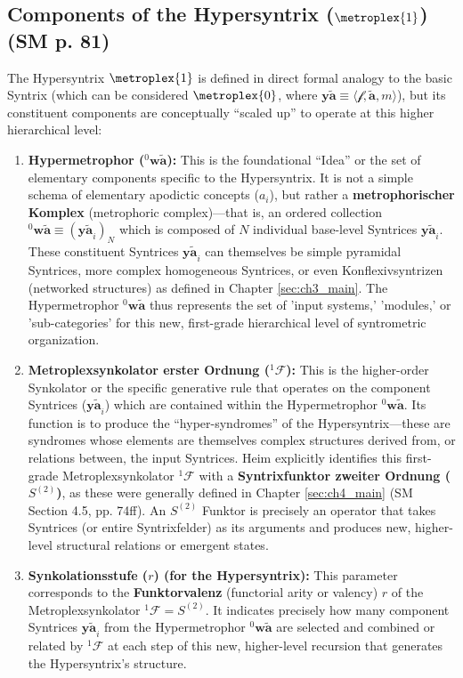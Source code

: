 \documentclass[
    12pt,              %
    a4paper,           %
    headings=normal,   %
    twoside=true,      %
    BCOR=8mm,          %
]{scrbook}
\newcommand{\q}[1]{\enquote{#1}}
\newcommand{\syntrix}{\bm{y\widetilde{a}}}
\newcommand{\metrophor}{\bm{\widetilde{a}}}
\newcommand{\synkolator}{\mathcal{f}}
\newcommand{\synkolationsstufe}{m}
\newcommand{\hypersyntrix}{\metroplex{1}}
\newcommand{\hypermetrophor}[1]{{}^{#1}\mathbf{w\widetilde{a}}}
\newcommand{\metroplexsynkolator}[1]{{}^{#1}\mathcal{F}}
\newcommand{\metroplexfunktor}{S}
\begin{document}
\subsection{Components of the Hypersyntrix (\(\hypersyntrix\)) (SM p. 81)}
\label{sec:ch5_hypersyntrix_components}
The Hypersyntrix \(\hypersyntrix\) is defined in direct formal analogy to the basic Syntrix (which can be considered \(\metroplex{0}\), where \(\syntrix \equiv \langle \synkolator, \metrophor, \synkolationsstufe \rangle\)), but its constituent components are conceptually \q{scaled up} to operate at this higher hierarchical level:
\begin{enumerate}
    \item  \textbf{Hypermetrophor (\(\hypermetrophor{0}\)):} This is the foundational \q{Idea} or the set of elementary components specific to the Hypersyntrix. It is not a simple schema of elementary apodictic concepts (\(a_i\)), but rather a \textbf{metrophorischer Komplex} (metrophoric complex)—that is, an ordered collection \(\hypermetrophor{0} \equiv (\syntrix_i)_N\) which is composed of \(N\) individual base-level Syntrices \(\syntrix_i\). These constituent Syntrices \(\syntrix_i\) can themselves be simple pyramidal Syntrices, more complex homogeneous Syntrices, or even Konflexivsyntrizen (networked structures) as defined in Chapter \ref{sec:ch3_main}. The Hypermetrophor \(\hypermetrophor{0}\) thus represents the set of 'input systems,' 'modules,' or 'sub-categories' for this new, first-grade hierarchical level of syntrometric organization.
    \item  \textbf{Metroplexsynkolator erster Ordnung (\(\metroplexsynkolator{1}\)):} This is the higher-order Synkolator or the specific generative rule that operates on the component Syntrices (\(\syntrix_i\)) which are contained within the Hypermetrophor \(\hypermetrophor{0}\). Its function is to produce the \q{hyper-syndromes} of the Hypersyntrix—these are syndromes whose elements are themselves complex structures derived from, or relations between, the input Syntrices. Heim explicitly identifies this first-grade Metroplexsynkolator \(\metroplexsynkolator{1}\) with a \textbf{Syntrixfunktor zweiter Ordnung (\(\metroplexfunktor^{(2)}\))}, as these were generally defined in Chapter \ref{sec:ch4_main} (SM Section 4.5, pp. 74ff). An \(\metroplexfunktor^{(2)}\) Funktor is precisely an operator that takes Syntrices (or entire Syntrixfelder) as its arguments and produces new, higher-level structural relations or emergent states.
    \item  \textbf{Synkolationsstufe (\(r\)) (for the Hypersyntrix):} This parameter corresponds to the \textbf{Funktorvalenz} (functorial arity or valency) \(r\) of the Metroplexsynkolator \(\metroplexsynkolator{1} = \metroplexfunktor^{(2)}\). It indicates precisely how many component Syntrices \(\syntrix_i\) from the Hypermetrophor \(\hypermetrophor{0}\) are selected and combined or related by \(\metroplexsynkolator{1}\) at each step of this new, higher-level recursion that generates the Hypersyntrix’s structure.
\end{enumerate}
\end{document}
